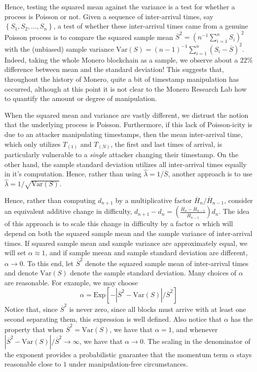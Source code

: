 \documentclass[12pt,english]{mrl}
\theoremstyle{definition}
\numberwithin{equation}{section}
\numberwithin{figure}{section}
\numberwithin{equation}{section}
\numberwithin{equation}{section}
\numberwithin{figure}{section}
\begin{document}
Hence, testing the squared mean against the variance is a test for whether a process is Poisson or not. Given a sequence of inter-arrival times, say $\left\{S_1, S_2, \ldots, S_n\right\}$, a test of whether these inter-arrival times came from a genuine Poisson process is to compare the squared sample mean $\overline{S}^2 = \left(n^{-1}\sum_{i=1}^{n} S_i\right)^2$ with the (unbiased) sample variance $\text{Var}(S) = (n-1)^{-1}\sum_{i=1}^{n} (S_i - \overline{S})^2$. Indeed, taking the whole Monero blockchain as a sample, we observe about a $22\%$ difference between mean and the standard deviation! This suggests that, throughout the history of Monero, quite a bit of timestamp manipulation has occurred, although at this point it is not clear to the Monero Research Lab how to quantify the amount or degree of manipulation.

When the squared mean and variance are vastly different, we distrust the notion that the underlying process is Poisson. Furthermore, if this lack of Poisson-icity is due to an attacker manipulating timestamps, then the mean inter-arrival time, which only utilizes $T_{(1)}$ and $T_{(N)}$, the first and last times of arrival, is particularly vulnerable to a \textit{single} attacker changing their timestamp. On the other hand, the sample standard deviation utilizes all inter-arrival times equally in it's computation. Hence, rather than using $\hat{\lambda} = 1/\overline{S}$, another approach is to use $\hat{\lambda} = 1/\sqrt{\text{Var}(S)}$.

Hence, rather than computing $d_{n+1}$ by a multiplicative factor $\overline{H}_n/\overline{H}_{n-1}$, consider an equivalent additive change in difficulty, $d_{n+1} - d_n = (\frac{\overline{H}_n - \overline{H}_{n-1}}{\overline{H}_{n-1}})d_n$. The idea of this approach is to scale  this change in difficulty by a factor $\alpha$ which will depend on both the squared sample mean and the sample variance of inter-arrival times. If squared sample mean and sample variance are approximately equal, we will set $\alpha \approx 1$, and if sample meean and sample standard deviation are different, $\alpha \to 0$. To this end, let $\overline{S}^2$ denote the squared sample mean of inter-arrival times and denote $\text{Var}(S)$ denote the sample standard deviation. Many choices of $\alpha$ are reasonable. For example, we may choose
\[\alpha = \text{Exp}\left[-\left|\overline{S}^2-\text{Var}(S)\right|/\overline{S}^2\right]\]
Notice that, since $\overline{S}^2$ is never zero, since all blocks must arrive with at least one second separating them, this expression is well defined. Also notice that $\alpha$ has the property that when $\overline{S}^2 = \text{Var}(S)$, we have that $\alpha = 1$, and whenever $\left|\overline{S}^2 - \text{Var}(S)\right|/\overline{S}^2 \to \infty$, we have that $\alpha \to 0$. The scaling in the denominator of the exponent provides a probabilistic guarantee that the momentum term $\alpha$ stays reasonable close to $1$ under manipulation-free circumstances.
\end{document}
